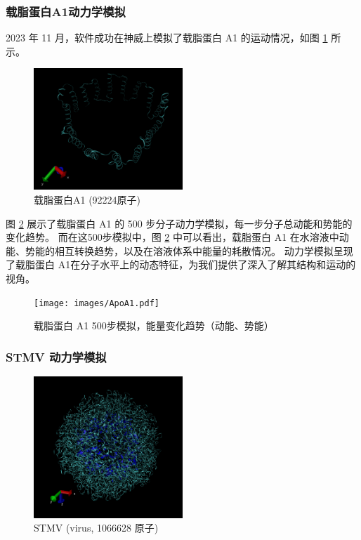 \subsubsection{载脂蛋白A1动力学模拟}

2023 年 11 月，软件成功在神威上模拟了载脂蛋白 A1 的运动情况，如图 \ref{fig:apoa1} 所示。

\begin{figure}[h]
    \centering
    \includegraphics[width=0.5\textwidth]{images/ApoA1.png}
    \caption{载脂蛋白A1 (92224原子)}
    \label{fig:apoa1}
\end{figure}

图 \ref{fig:apoa1-plot} 展示了载脂蛋白 A1 的 500 步分子动力学模拟，每一步分子总动能和势能的变化趋势。
而在这500步模拟中，图 \ref{fig:apoa1-plot} 中可以看出，载脂蛋白 A1 在水溶液中动能、势能的相互转换趋势，以及在溶液体系中能量的耗散情况。
动力学模拟呈现了载脂蛋白 A1在分子水平上的动态特征，为我们提供了深入了解其结构和运动的视角。

\begin{figure}[h]
    \centering
    \texttt{[image: images/ApoA1.pdf]}
    \caption{载脂蛋白 A1 500步模拟，能量变化趋势（动能、势能）}
    \label{fig:apoa1-plot}
\end{figure}


\subsubsection{STMV 动力学模拟}

\begin{figure}[H]
    \centering
    \includegraphics[width=0.5\textwidth]{images/STMV.png}
    \caption{STMV (virus, 1066628 原子)}
    \label{fig:stmv}
\end{figure}

